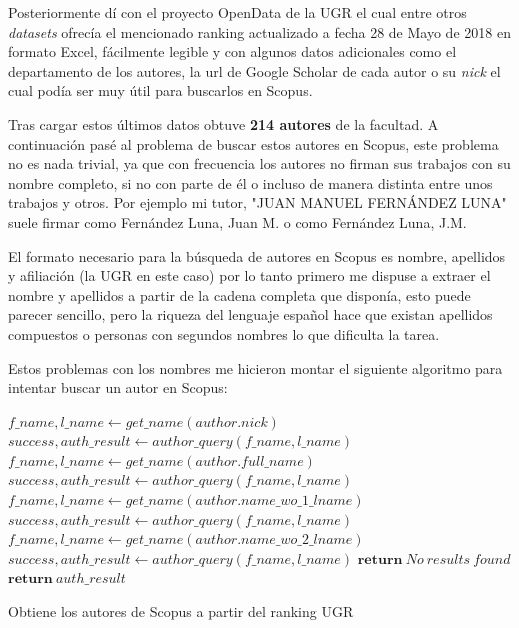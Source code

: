 Posteriormente dí con el proyecto OpenData de la \acrlong{UGR} el cual entre otros \textit{datasets} ofrecía el mencionado ranking actualizado a fecha 28 de Mayo de 2018 \cite{opendataUGR} en formato Excel, fácilmente legible y con algunos datos adicionales como el departamento de los autores, la url de Google Scholar de cada autor o su \textit{nick} el cual podía ser muy útil para buscarlos en Scopus.

Tras cargar estos últimos datos obtuve \textbf{214 autores} de la facultad. A continuación pasé al problema de buscar estos autores en Scopus, este problema no es nada trivial, ya que con frecuencia los autores no firman sus trabajos con su nombre completo, si no con parte de él o incluso de manera distinta entre unos trabajos y otros. Por ejemplo mi tutor, "JUAN MANUEL FERNÁNDEZ LUNA" suele firmar como Fernández Luna, Juan M. o como Fernández Luna, J.M.

El formato necesario para la búsqueda de autores en Scopus es nombre, apellidos y afiliación (la \acrshort{UGR} en este caso) por lo tanto primero me dispuse a extraer el nombre y apellidos a partir de la cadena completa que disponía, esto puede parecer sencillo, pero la riqueza del lenguaje español hace que existan apellidos compuestos o personas con segundos nombres lo que dificulta la tarea.

Estos problemas con los nombres me hicieron montar el siguiente algoritmo para intentar buscar un autor en Scopus:


\begin{algorithm}[h]
	\begin{algorithmic} 
		\State $f\_name, l\_name \gets get\_name(author.nick)$
		\State $success, auth\_result  \gets author\_query(f\_name, l\_name)$
		\State $f\_name, l\_name \gets get\_name(author.full\_name)$
		\State $success, auth\_result  \gets author\_query(f\_name, l\_name)$
		\State $f\_name, l\_name \gets get\_name(author.name\_wo\_1\_lname)$
		\State $success, auth\_result  \gets author\_query(f\_name, l\_name)$
		\State $f\_name, l\_name \gets get\_name(author.name\_wo\_2\_lname)$
		\State $success, auth\_result  \gets author\_query(f\_name, l\_name)$
		\State $\textbf{return}\ No\ results\ found$
		\EndIf
		\EndIf
		\EndIf
		\EndIf
		\State $\textbf{return}\ auth\_result$
	
		\EndFor
	\end{algorithmic}  
	\caption{Obtiene los autores de Scopus a partir del ranking UGR}	
\end{algorithm}


